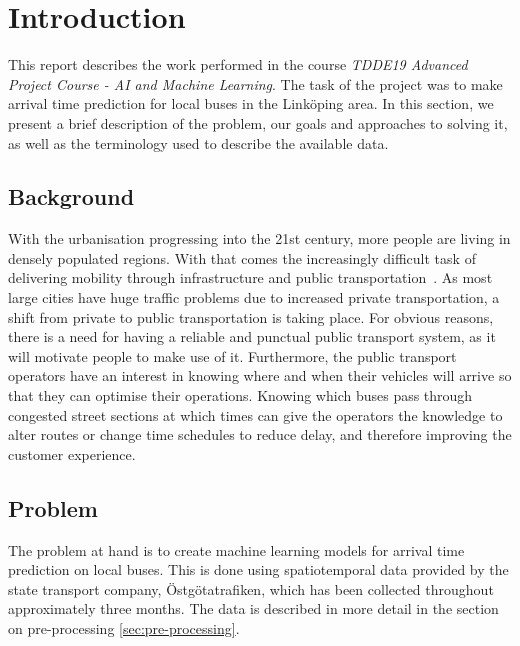 


\chapter{Introduction}
\label{cha:introduction}
This report describes the work performed in the course \textit{TDDE19 Advanced Project Course - AI and Machine Learning}. The task of the project was to make arrival time prediction for local buses in the Link\"oping area. In this section, we present a brief description of the problem, our goals and approaches to solving it, as well as the terminology used to describe the available data.

\section{Background}
With the urbanisation progressing into the 21st century, more people are living in densely populated regions. With that comes the increasingly difficult task of delivering mobility through infrastructure and public transportation~\cite{kotter2004risks}. As most large cities have huge traffic problems due to increased private transportation, a shift from private to public transportation is taking place. For obvious reasons, there is a need for having a reliable and punctual public transport system, as it will motivate people to make use of it. Furthermore, the public transport operators have an interest in knowing where and when their vehicles will arrive so that they can optimise their operations. Knowing which buses pass through congested street sections at which times can give the operators the knowledge to alter routes or change time schedules to reduce delay, and therefore improving the customer experience.

\section{Problem}
\label{sec:problem}
The problem at hand is to create machine learning models for arrival time prediction on local buses. This is done using spatiotemporal data provided by the state transport company, \"Ostg\"otatrafiken, which has been collected throughout approximately three months. The data is described in more detail in the section on pre-processing \ref{sec:pre-processing}.

